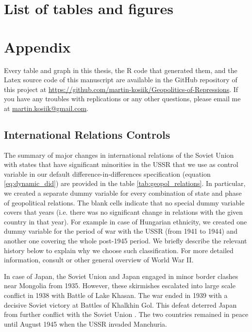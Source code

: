 \newpage
\section*{List of tables and figures}
\listoftables
\listoffigures



\newpage
\section*{Appendix}
Every table and graph in this thesis, the R code that generated them, and the Latex source code of this manuscript are available in the GitHub repository of this project at \url{https://github.com/martin-kosiik/Geopolitics-of-Repressions}.
If you have any troubles with replications or any other questions, please email me at \href{mailto:martin.kosiik@gmail.com}{martin.kosiik@gmail.com}.
\setcounter{table}{0}
\renewcommand{\thetable}{A\arabic{table}}

\setcounter{figure}{0}
\renewcommand{\thefigure}{A\arabic{figure}}

\subsection*{International Relations Controls}
The summary of major changes in international relations of the Soviet Union with states that have significant minorities in the USSR that we use as control variable in our default  difference-in-differences specification (equation \ref{eq:dynamic_did}) are provided in the table \ref{tab:geopol_relations}. In particular, we created a separate dummy variable for every combination of state and  phase of geopolitical relations. 
The blank cells indicate that no special dummy variable covers that years (i.e. there was no significant change in relations with the given country in that year).
For example in case of Hungarian ethnicity, we created one dummy variable for the period of war with the USSR (from 1941 to 1944) and another one covering the whole post-1945 period. 
We briefly describe the relevant history below to explain why we choose such classification. 
For more detailed information, consult \citet{weinberg_world_2005} or other general overview of World War II.

In case of Japan, the Soviet Union and Japan engaged in minor border clashes near Mongolia from 1935. However, these skirmishes escalated into large scale conflict in 1938 with Battle of Lake Khasan. The war ended in 1939 with a decisive Soviet victory at Battles of Khalkhin  Gol. This defeat deterred Japan from further conflict with the Soviet Union \citep{haslam_soviet_1992}. The two countries remained in peace until August 1945 when the USSR invaded Manchuria. 

